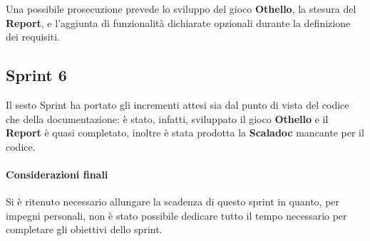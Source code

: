 Una possibile prosecuzione prevede lo sviluppo del gioco \textbf{Othello}, la stesura del \textbf{Report}, e l'aggiunta di funzionalità dichiarate opzionali durante la definizione dei requisiti.

\subsection{Sprint 6}
%
Il sesto Sprint ha portato gli incrementi attesi sia dal punto di vista del codice che della documentazione: è stato, infatti, sviluppato il gioco \textbf{Othello} e il \textbf{Report} è quasi completato, inoltre è stata prodotta la \textbf{Scaladoc} mancante per il codice.
%
\paragraph{Considerazioni finali}
%
Si è ritenuto necessario allungare la scadenza di questo sprint in quanto, per impegni personali, non è stato possibile dedicare tutto il tempo necessario per completare gli obiettivi dello sprint.